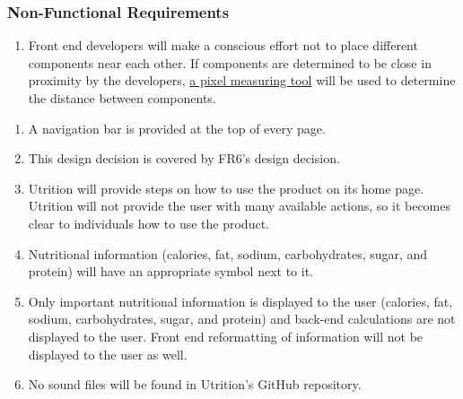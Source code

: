 \documentclass[12pt, titlepage]{article}
\begin{document}
\subsubsection{Non-Functional Requirements}
\begin{enumerate}[{LF}1. ]
	\item Front end developers will make a conscious effort not to place different components near each other. If components are determined to be close in proximity by the developers, \href{https://www.rapidtables.com/web/tools/pixel-ruler.html}{a pixel measuring tool} will be used to determine the distance between components.
\end{enumerate}

\begin{enumerate}[{UH}1. ]
	\item A navigation bar is provided at the top of every page.
	\item This design decision is covered by FR6's design decision.
	\item Utrition will provide steps on how to use the product on its home page. Utrition will not provide the user with many available actions, so it becomes clear to individuals how to use the product. 
	\item Nutritional information (calories, fat, sodium, carbohydrates, sugar, and protein) will have an appropriate symbol next to it.
	\item Only important nutritional information is displayed to the user (calories, fat, sodium, carbohydrates, sugar, and protein) and back-end calculations are not displayed to the user. Front end reformatting of information will not be displayed to the user as well.
	\item No sound files will be found in Utrition's GitHub repository.
\end{enumerate}
\end{document}
